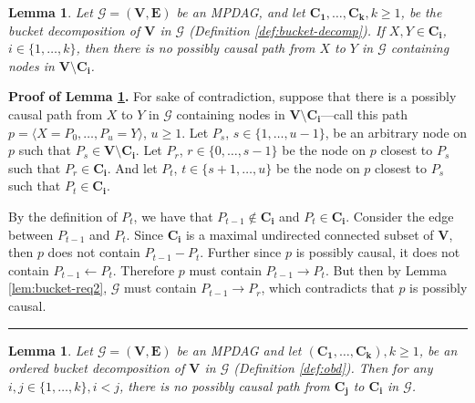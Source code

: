 \documentclass[11pt]{article}
\newcommand{\BlackBox}{\rule{1.5ex}{1.5ex}}  %
\newtheorem{lemma}[theorem]{Lemma}
\newcommand{\mb}[1]{\mathbf{#1}}
\newcommand{\g}[1][G]{\mathcal{#1}}
\newenvironment{proofof}[1][]{\noindent \textbf{Proof of #1.}}{\hfill\BlackBox}
\begin{document}
\begin{lemma}
\label{lem:bucket-restrict1}
    Let $\g=(\mb{V},\mb{E})$ be an MPDAG, and let $\mb{C_1}, \dots, \mb{C_k}, k \ge 1$, be the bucket decomposition of $\mb{V}$ in $\g$ (Definition \ref{def:bucket-decomp}). If $X, Y \in \mb{C_i}$, $i \in \{1, \dots, k\}$, then there is no possibly causal path from $X$ to $Y$ in $\g$ containing nodes in $\mb{V} \setminus \mb{C_i}$.
\end{lemma}

\begin{proofof}[Lemma \ref{lem:bucket-restrict1}]
    For sake of contradiction, suppose that there is a possibly causal path from $X$ to $Y$ in $\g$ containing nodes in $\mb{V} \setminus \mb{C_i}$---call this path $p=\langle X=P_0, \dots, P_u=Y \rangle$, $u \ge 1$. Let $P_s$, $s \in \{1, \dots, u-1\}$, be an arbitrary node on $p$ such that $P_s \in \mb{V} \setminus \mb{C_i}$. Let $P_r$, $r \in \{0, \dots, s-1\}$ be the node on $p$ closest to $P_s$ such that $P_r \in \mb{C_i}$. And let $P_t$, $t \in \{s+1, \dots, u\}$ be the node on $p$ closest to $P_s$ such that $P_t \in \mb{C_i}$.

    By the definition of $P_t$, we have that $P_{t-1} \notin \mb{C_i}$ and $P_t \in \mb{C_i}$. Consider the edge between $P_{t-1}$ and $P_t$. Since $\mb{C_i}$ is a maximal undirected connected subset of $\mb{V}$, then $p$ does not contain $P_{t-1} - P_t$. Further since $p$ is possibly causal, it does not contain $P_{t-1} \gets P_t$. Therefore $p$ must contain $P_{t-1} \to P_t$. But then by Lemma \ref{lem:bucket-req2}, $\g$ must contain $P_{t-1} \to P_r$, which contradicts that $p$ is possibly causal.
\end{proofof}


\begin{lemma} 
\label{lem:bucket-restrict2}
    Let $\g=(\mb{V},\mb{E})$ be an MPDAG and let $(\mb{C_1}, \dots, \mb{C_k}), k \ge 1$, be an ordered bucket decomposition of $\mb{V}$ in $\g$ (Definition \ref{def:obd}). Then for any $i, j \in \{1, \dots, k\}, i < j$, there is no possibly causal path from $\mb{C_j}$ to $\mb{C_i}$ in $\g$.
\end{lemma} 
\end{document}
